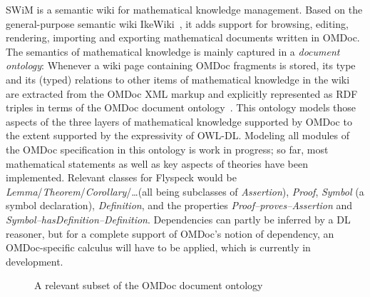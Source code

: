 \documentclass{llncs}
\begin{document}
SWiM is a semantic wiki for mathematical knowledge management.  Based on the
general-purpose semantic wiki IkeWiki~\cite{KrSchVr:semwiki-reasoning07}, it adds support
for browsing, editing, rendering, importing and exporting mathematical documents written
in OMDoc.  The semantics of mathematical knowledge is mainly captured in a \emph{document
  ontology}: Whenever a wiki page containing OMDoc fragments is stored, its type and its
(typed) relations to other items of mathematical knowledge in the wiki are extracted from
the OMDoc XML markup and explicitly represented as RDF triples in terms of the OMDoc
document ontology~\cite{OMDocDocOnto:web}.  This ontology models those aspects of the
three layers of mathematical knowledge supported by OMDoc to the extent supported by the
expressivity of OWL-DL.  Modeling all modules of the OMDoc specification in this ontology
is work in progress; so far, most mathematical statements as well as key aspects of
theories have been implemented.  Relevant classes for Flyspeck would be
\textit{Lemma}/\textit{Theorem}/\textit{Corollary}/\ldots (all being subclasses of
\textit{Assertion}), \textit{Proof}, \textit{Symbol} (a symbol declaration),
\textit{Definition}, and the properties \textit{Proof--proves--Assertion} and
\textit{Symbol--hasDefinition--Definition}.  Dependencies can partly be inferred by a DL
reasoner, but for a complete support of OMDoc's notion of dependency, an OMDoc-specific
calculus will have to be applied, which is currently in development.

\begin{figure}
  \centering
  \caption{A relevant subset of the OMDoc document ontology}
  \label{fig:doconto}
\end{figure}
\end{document}
